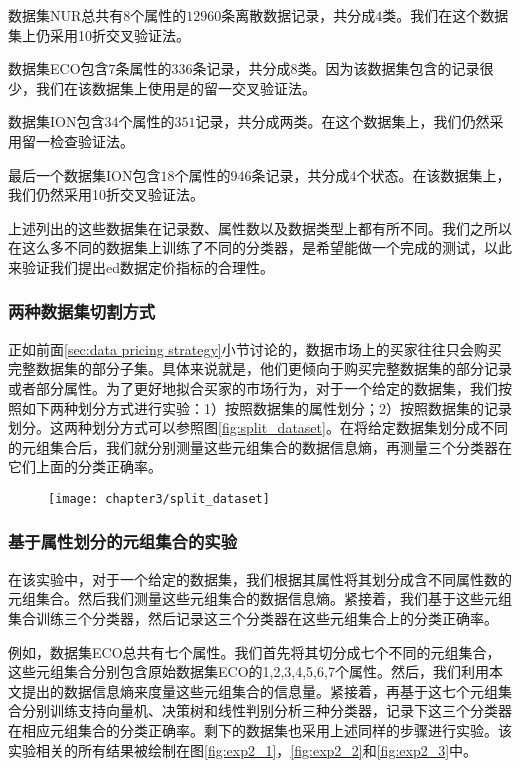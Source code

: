 数据集NUR总共有$8$个属性的$12960$条离散数据记录，共分成$4$类。我们在这个数据集上仍采用10折交叉验证法。

数据集ECO包含$7$条属性的$336$条记录，共分成$8$类。因为该数据集包含的记录很少，我们在该数据集上使用是的留一交叉验证法。

数据集ION包含$34$个属性的$351$记录，共分成两类。在这个数据集上，我们仍然采用留一检查验证法。

最后一个数据集ION包含$18$个属性的$946$条记录，共分成$4$个状态。在该数据集上，我们仍然采用10折交叉验证法。

上述列出的这些数据集在记录数、属性数以及数据类型上都有所不同。我们之所以在这么多不同的数据集上训练了不同的分类器，是希望能做一个完成的测试，以此来验证我们提出ed数据定价指标的合理性。

\subsubsection{两种数据集切割方式}
\label{subsubsec:two_splitting_ways}

正如前面\ref{sec:data pricing strategy}小节讨论的，数据市场上的买家往往只会购买完整数据集的部分子集。具体来说就是，他们更倾向于购买完整数据集的部分记录或者部分属性。为了更好地拟合买家的市场行为，对于一个给定的数据集，我们按照如下两种划分方式进行实验：1）按照数据集的属性划分；2）按照数据集的记录划分。这两种划分方式可以参照图\ref{fig:split_dataset}。在将给定数据集划分成不同的元组集合后，我们就分别测量这些元组集合的数据信息熵，再测量三个分类器在它们上面的分类正确率。

\begin{figure}[h]
  \centering
    \texttt{[image: chapter3/split\_dataset]}
\end{figure}

\subsubsection{基于属性划分的元组集合的实验}
在该实验中，对于一个给定的数据集，我们根据其属性将其划分成含不同属性数的元组集合。然后我们测量这些元组集合的数据信息熵。紧接着，我们基于这些元组集合训练三个分类器，然后记录这三个分类器在这些元组集合上的分类正确率。

例如，数据集ECO总共有七个属性。我们首先将其切分成七个不同的元组集合，这些元组集合分别包含原始数据集ECO的1,2,3,4,5,6,7个属性。然后，我们利用本文提出的数据信息熵来度量这些元组集合的信息量。紧接着，再基于这七个元组集合分别训练支持向量机、决策树和线性判别分析三种分类器，记录下这三个分类器在相应元组集合的分类正确率。剩下的数据集也采用上述同样的步骤进行实验。该实验相关的所有结果被绘制在图\ref{fig:exp2_1}，\ref{fig:exp2_2}和\ref{fig:exp2_3}中。

